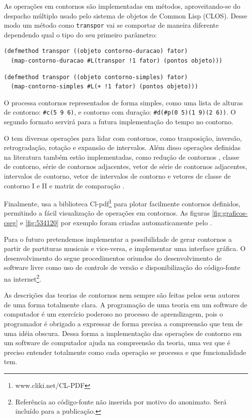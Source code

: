 As operações em contornos são implementadas em métodos,
aproveitando-se do despacho múltiplo usado pelo sistema de objetos de
Common Lisp (CLOS). Desse modo um método como \texttt{transpor} vai se
comportar de maneira diferente dependendo qual o tipo do seu primeiro
parâmetro:

\begin{verbatim}
(defmethod transpor ((objeto contorno-duracao) fator)
  (map-contorno-duracao #L(transpor !1 fator) (pontos objeto)))
\end{verbatim}

\begin{verbatim}
(defmethod transpor ((objeto contorno-simples) fator)
  (map-contorno-simples #L(+ !1 fator) (pontos objeto)))
\end{verbatim}

O \goiaba{} processa contornos representados de forma simples, como
uma lista de alturas de contorno: \verb!#c(5 9 6)!, e contorno com
duração: \verb!#d(#p(0 5)(1 9)(2 6))!. O segundo formato servirá para
a futura implementação do tempo no contorno.

O \goiaba{} tem diversas operações para lidar com contornos, como
tranposição, inversão, retrogradação, rotação e expansão de
intervalos. Além disso operações definidas na literatura também estão
implementadas, como redução de contornos \cite{adams76:melodic},
classe de contorno, série de contornos adjacentes, vetor de série de
contornos adjacentes, intervalos de contorno, vetor de intervalos de
contorno e vetores de classe de contorno I e II
\cite{friedmann85:methodology} e matriz de comparação
\cite{morris93:directions}.

Finalmente, \goiaba{} usa a biblioteca
Cl-pdf\footnote{www.cliki.net/CL-PDF} para plotar facilmente contornos
definidos, permitindo a fácil visualização de operações em
contornos. As figuras \ref{fig:graficos-cseg} e \ref{fig:534120} por
exemplo foram criadas automaticamente pelo \goiaba{}.

Para o futuro pretendemos implementar a possibilidade de gerar
contornos a partir de partituras musicais e vice-versa, e implementar
uma interface gráfica. O desenvolvimento do \goiaba{} segue
procedimentos oriundos do desenvolvimento de software livre como uso
de controle de versão e disponibilização do código-fonte na
internet\footnote{Referência ao código-fonte não inserida por motivo
  do anonimato. Será incluído para a publicação.}.

As descrições das teorias de contornos nem sempre são feitas pelos
seus autores de uma forma totalmente clara. A programação de uma
teoria em um software de computador é um exercício poderoso no
processo de aprendizagem, pois o programador é obrigado a expressar de
forma precisa a compreensão que tem de uma idéia obscura. Dessa forma
a implementação das operações de contorno em um software de computador
ajuda na compreensão da teoria, uma vez que é preciso entender
totalmente como cada operação se processa e que funcionalidade tem.

